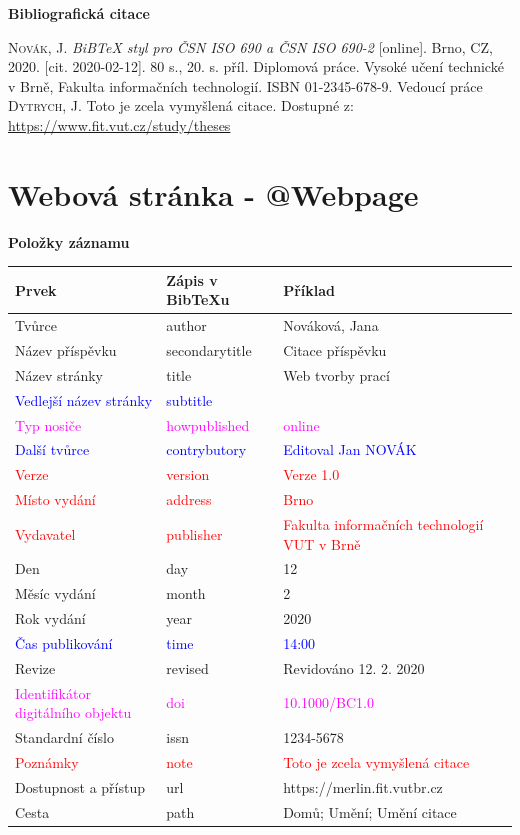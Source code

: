 \bigskip

\noindent \textbf{Bibliografická citace}

\medskip

\noindent \textsc{Novák}, J. \textit{BiBTeX styl pro ČSN ISO 690 a ČSN ISO 690-2} [online]. Brno, CZ, 2020. [cit. 2020-02-12]. 80 s., 20. s. příl. Diplomová práce. Vysoké učení technické v Brně, Fakulta informačních technologií. ISBN 01-2345-678-9. Vedoucí práce \textsc{Dytrych}, J. Toto je zcela vymyšlená citace. Dostupné z: \url{https://www.fit.vut.cz/study/theses}
\newpage
\section*{Webová stránka - @Webpage}
\label{pr-webpage}
\noindent \textbf{Položky záznamu}

\medskip

\begin{tabularx}{\linewidth}{X X X}
    Prvek & Zápis v BibTeXu & Příklad\\\hline
    Tvůrce & author & Nováková, Jana\\
    Název příspěvku & secondarytitle & Citace příspěvku\\
    Název stránky & title & Web tvorby prací\\
    \textcolor{blue}{Vedlejší název stránky}  &  \textcolor{blue}{subtitle} & \\
    \textcolor{magenta}{Typ nosiče} & \textcolor{magenta}{howpublished} & \textcolor{magenta}{online}\\
    \textcolor{blue}{Další tvůrce} & \textcolor{blue}{contrybutory} & \textcolor{blue}{Editoval Jan NOVÁK}\\
    \textcolor{red}{Verze} & \textcolor{red}{version} & \textcolor{red}{Verze 1.0}\\
    \textcolor{red}{Místo vydání} & \textcolor{red}{address} & \textcolor{red}{Brno}\\
    \textcolor{red}{Vydavatel} & \textcolor{red}{publisher} & \textcolor{red}{Fakulta informačních technologií VUT v Brně}\\
    Den & day & 12\\
    Měsíc vydání & month & 2\\
    Rok vydání & year & 2020\\
    \textcolor{blue}{Čas publikování} & \textcolor{blue}{time} & \textcolor{blue}{14:00}\\
    Revize & revised & Revidováno 12. 2. 2020\\
    \textcolor{magenta}{Identifikátor digitálního objektu} & \textcolor{magenta}{doi} & \textcolor{magenta}{10.1000/BC1.0}\\
    Standardní číslo & issn & 1234-5678\\
    \textcolor{red}{Poznámky} & \textcolor{red}{note} & \textcolor{red}{Toto je zcela vymyšlená citace}\\
    Dostupnost a přístup & url & https://merlin.fit.vutbr.cz\\
    Cesta & path & Domů; Umění; Umění citace
\end{tabularx}

